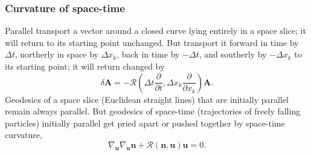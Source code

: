\subsubsection{Curvature of space-time}
Parallel transport a vector around a closed curve lying entirely in a space slice; it will return to its starting point unchanged.
But transport it forward in time by $\Delta t$, northerly in space by $\Delta x_k$, back in time by $-\Delta t$, and southerly by $-\Delta x_k$ to its starting point; it will return changed by
\[\delta \bm{A} = -\mathcal{R}(\Delta t \frac{\partial}{\partial t},\Delta x_k \frac{\partial}{\partial x_k}) \bm{A}.\]
Geodesics of a space slice (Euclidean straight lines) that are initially parallel remain always parallel. But geodesics of space-time (trajectories of freely falling particles) initially parallel get pried apart or pushed together by space-time curvature,
\[\nabla_{\bm{u}} \nabla_{\bm{u}} \bm{n} + \mathcal{R}(\bm{n},\bm{u})\bm{u} = 0.\]

